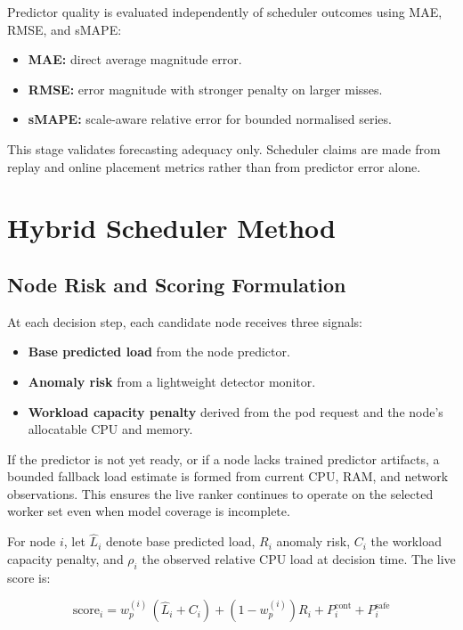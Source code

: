 Predictor quality is evaluated independently of scheduler outcomes using MAE, RMSE, and sMAPE:

\begin{itemize}
\item \textbf{MAE:} direct average magnitude error.
\item \textbf{RMSE:} error magnitude with stronger penalty on larger misses.
\item \textbf{sMAPE:} scale-aware relative error for bounded normalised series.
\end{itemize}

This stage validates forecasting adequacy only. Scheduler claims are made from replay and online placement metrics rather than from predictor error alone.


\section{Hybrid Scheduler Method}

\subsection{Node Risk and Scoring Formulation}

At each decision step, each candidate node receives three signals:

\begin{itemize}
\item \textbf{Base predicted load} from the node predictor.
\item \textbf{Anomaly risk} from a lightweight detector monitor.
\item \textbf{Workload capacity penalty} derived from the pod request and the node's allocatable CPU and memory.
\end{itemize}

If the predictor is not yet ready, or if a node lacks trained predictor artifacts, a bounded fallback load estimate is formed from current CPU, RAM, and network observations. This ensures the live ranker continues to operate on the selected worker set even when model coverage is incomplete.

For node \(i\), let \(\hat{L}_i\) denote base predicted load, \(R_i\) anomaly risk, \(C_i\) the workload capacity penalty, and \(\rho_i\) the observed relative CPU load at decision time. The live score is:

\[
\text{score}_i = w_p^{(i)}\,(\hat{L}_i + C_i) + \left(1-w_p^{(i)}\right)R_i + P_i^{\text{cont}} + P_i^{\text{safe}}
\]

